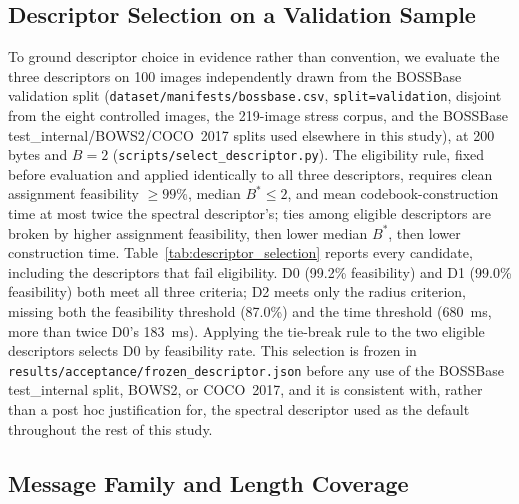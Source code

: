 \documentclass[preprint,12pt]{elsarticle}
\theoremstyle{plain}
\begin{document}
\subsection{Descriptor Selection on a Validation Sample}

To ground descriptor choice in evidence rather than convention, we evaluate
the three descriptors on 100 images independently drawn from the BOSSBase
validation split (\texttt{dataset/manifests/bossbase.csv}, \texttt{split=validation},
disjoint from the eight controlled images, the 219-image stress corpus, and
the BOSSBase test\_internal/BOWS2/COCO~2017 splits used elsewhere in this
study), at 200 bytes and $B=2$ (\texttt{scripts/select\_descriptor.py}). The
eligibility rule, fixed before evaluation and applied identically to all
three descriptors, requires clean assignment feasibility $\geq99\%$,
median $B^\ast\leq2$, and mean codebook-construction time at most twice
the spectral descriptor's; ties among eligible descriptors are broken by
higher assignment feasibility, then lower median $B^\ast$, then lower construction time.
Table~\ref{tab:descriptor_selection} reports every candidate, including the
descriptors that fail eligibility. D0 (99.2\% feasibility) and D1 (99.0\% feasibility)
both meet all three criteria; D2 meets only the radius criterion, missing
both the feasibility threshold (87.0\%) and the time threshold (680~ms, more than
twice D0's 183~ms). Applying the tie-break rule to the two eligible
descriptors selects D0 by feasibility rate. This selection is frozen in
\texttt{results/acceptance/frozen\_descriptor.json} before any use of the
BOSSBase test\_internal split, BOWS2, or COCO~2017, and it is consistent with,
rather than a post hoc justification for, the spectral descriptor used as the
default throughout the rest of this study.

\begin{table}[!t]
\centering
\caption{Descriptor Selection on 100 BOSSBase Validation Images (200 Bytes, $B=2$)}
\label{tab:descriptor_selection}

\end{table}

\subsection{Message Family and Length Coverage}
\end{document}
